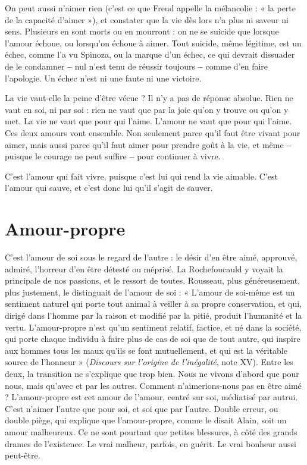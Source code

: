 On peut aussi n’aimer rien (c’est ce que Freud appelle la mélancolie : « la
perte de la capacité d’aimer »), et constater que la vie dès lors n’a plus ni saveur
ni sens. Plusieurs en sont morts ou en mourront : on ne se suicide que lorsque
l'amour échoue, ou lorsqu'on échoue à aimer. Tout suicide, même légitime, est
un échec, comme l’a vu Spinoza, ou la marque d’un échec, ce qui devrait dissuader
de le condamner {\bf --} nul n’est tenu de réussir toujours {\bf --} comme d’en faire
l'apologie. Un échec n’est ni une faute ni une victoire.

La vie vaut-elle la peine d’être vécue ? Il n’y a pas de réponse absolue. Rien
ne vaut en soi, ni par soi : rien ne vaut que par la joie qu’on y trouve ou qu’on
y met. La vie ne vaut que pour qui l’aime. L'amour ne vaut que pour qui
l'aime. Ces deux amours vont ensemble. Non seulement parce qu’il faut être
vivant pour aimer, mais aussi parce qu’il faut aimer pour prendre goût à la vie,
et même {\bf --} puisque le courage ne peut suffire {\bf --} pour continuer à vivre.

C’est l'amour qui fait vivre, puisque c’est lui qui rend la vie aimable. C’est
l'amour qui sauve, et c’est donc lui qu’il s’agit de sauver.

\section{Amour-propre}
C'est l’amour de soi sous le regard de l’autre : le désir d’en
être aimé, approuvé, admiré, l’horreur d’en être détesté
ou méprisé. La Rochefoucauld y voyait la principale de nos passions, et le ressort
de toutes. Rousseau, plus généreusement, plus justement, le distinguait de
l'amour de soi : « L'amour de soi-même est un sentiment naturel qui porte tout
animal à veiller à sa propre conservation, et qui, dirigé dans l’homme par la
raison et modifié par la pitié, produit l'humanité et la vertu. L’amour-propre
n’est qu’un sentiment relatif, factice, et né dans la société, qui porte chaque
individu à faire plus de cas de soi que de tout autre, qui inspire aux hommes
tous les maux qu’ils se font mutuellement, et qui est la véritable source de
l’honneur » ({\it Discours sur l'origine de l'inégalité}, note XV). Entre les deux, la
transition ne s’explique que trop bien. Nous ne vivons d’abord que pour nous,
mais qu'avec et par les autres. Comment n’aimerions-nous pas en être aimé ?
L’amour-propre est cet amour de l’amour, centré sur soi, médiatisé par autrui.
C’est n’aimer l’autre que pour soi, et soi que par l’autre. Double erreur, ou
double piège, qui explique que l’amour-propre, comme le disait Alain, soit un
amour malheureux. Ce ne sont pourtant que petites blessures, à côté des grands
drames de l'existence. Le vrai malheur, parfois, en guérit. Le vrai bonheur aussi
peut-être.

